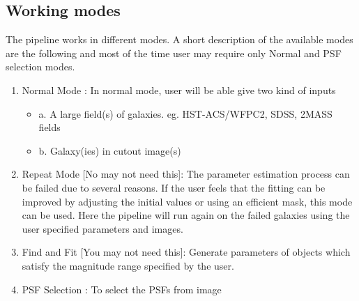 \documentclass[a4paper,10pt]{article}
\newcommand{\red}[1]{{\color{red}[#1]}}
\begin{document}
\subsection{Working modes}
The pipeline works in different modes. A short description of the available modes are the following and most of the time user may require only Normal and PSF selection modes.
\begin{enumerate}
 \item Normal Mode : In normal mode, user will be able give two kind of inputs
\begin{itemize}
\item 
a. A large field(s) of galaxies. eg. HST-ACS/WFPC2, SDSS, 2MASS fields
\item
b. Galaxy(ies) in cutout image(s)
\end{itemize}

\item Repeat Mode \red{No may not need this}: The parameter estimation process can be failed due to several reasons. If the user feels that the fitting can be improved by adjusting the initial values or using an efficient mask, this mode can be used. Here the pipeline will run again on the failed galaxies using the user specified parameters and images. %
\item Find and Fit \red{You may not need this}: Generate parameters of objects which satisfy the magnitude range specified by the user.

\item PSF Selection : To select the PSFs from image

\end{enumerate}
\end{document}
